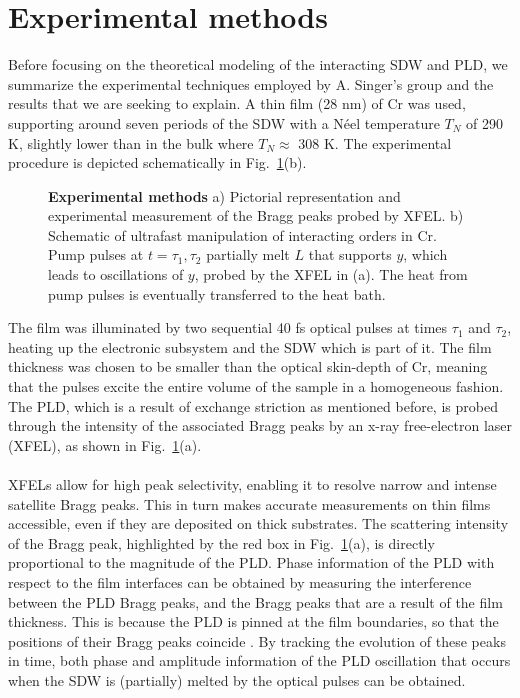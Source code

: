 \section{Experimental methods}
Before focusing on the theoretical modeling of the interacting SDW and PLD, we summarize the experimental techniques employed by A. Singer's group and the results that we are seeking to explain.
A thin film (28 nm) of Cr was used, supporting around seven periods of the SDW with a N\'eel temperature $T_N$ of 290 K, slightly lower than in the bulk where $T_N\approx$ 308 K.
The experimental procedure is depicted schematically in Fig.~\ref{fig:Cr_schematic}(b). 
\begin{figure}[h]
\caption{\label{fig:Cr_schematic}{\bf Experimental methods} a) Pictorial representation and experimental measurement of the Bragg peaks probed by XFEL. b) Schematic of ultrafast manipulation of interacting orders in Cr. Pump pulses at $t=\tau_1,\tau_2$ partially melt $L$ that supports $y$, which leads to oscillations of $y$, probed by the XFEL in (a). The heat from pump pulses is eventually transferred to the heat bath.}
\end{figure}
The film was illuminated by two sequential 40 fs optical pulses at times $\tau_1$ and $\tau_2$, heating up the electronic subsystem and the SDW which is part of it.
The film thickness was chosen to be smaller than the optical skin-depth of Cr, meaning that the pulses excite the entire volume of the sample in a homogeneous fashion.
The PLD, which is a result of exchange striction as mentioned before, is probed through the intensity of the associated Bragg peaks by an x-ray free-electron laser (XFEL)\cite{Singer2015prb, Singer2015prl}, as shown in Fig.~\ref{fig:Cr_schematic}(a).\\\\
XFELs allow for high peak selectivity, enabling it to resolve narrow and intense satellite Bragg peaks.
This in turn makes accurate measurements on thin films accessible, even if they are deposited on thick substrates.
The scattering intensity of the Bragg peak, highlighted by the red box in Fig.~\ref{fig:Cr_schematic}(a), is directly proportional to the magnitude of the PLD.
Phase information of the PLD with respect to the film interfaces can be obtained by measuring the interference between the PLD Bragg peaks, and the Bragg peaks that are a result of the film thickness.
This is because the PLD is pinned at the film boundaries, so that the positions of their Bragg peaks coincide \cite{Singer2015prb}.
By tracking the evolution of these peaks in time, both phase and amplitude information of the PLD oscillation that occurs when the SDW is (partially) melted by the optical pulses can be obtained.
